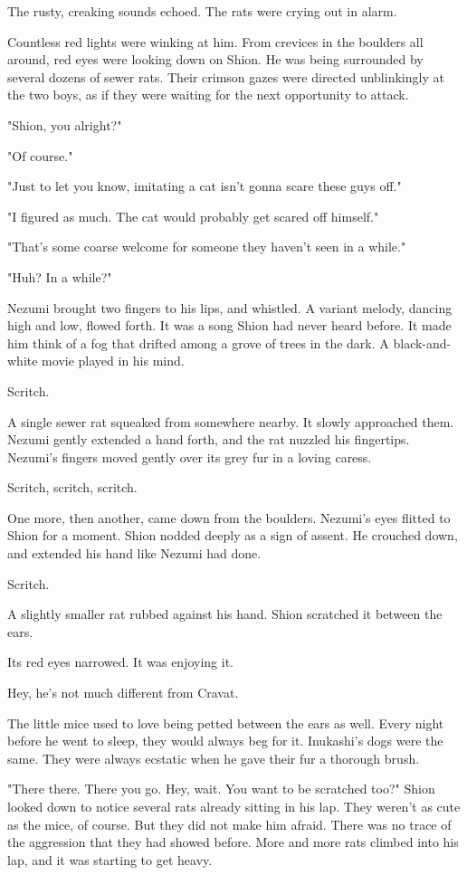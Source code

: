 The rusty, creaking sounds echoed. The rats were crying out in alarm.

Countless red lights were winking at him. From crevices in the boulders
all around, red eyes were looking down on Shion. He was being surrounded
by several dozens of sewer rats. Their crimson gazes were directed
unblinkingly at the two boys, as if they were waiting for the next
opportunity to attack.

"Shion, you alright?"

"Of course."

"Just to let you know, imitating a cat isn't gonna scare these guys
off."

"I figured as much. The cat would probably get scared off himself."

"That's some coarse welcome for someone they haven't seen in a while."

"Huh? In a while?"

Nezumi brought two fingers to his lips, and whistled. A variant melody,
dancing high and low, flowed forth. It was a song Shion had never heard
before. It made him think of a fog that drifted among a grove of trees
in the dark. A black-and-white movie played in his mind.

Scritch.

A single sewer rat squeaked from somewhere nearby. It slowly approached
them. Nezumi gently extended a hand forth, and the rat nuzzled his
fingertips. Nezumi's fingers moved gently over its grey fur in a loving
caress.

Scritch, scritch, scritch.

One more, then another, came down from the boulders. Nezumi's eyes
flitted to Shion for a moment. Shion nodded deeply as a sign of assent.
He crouched down, and extended his hand like Nezumi had done.

Scritch.

A slightly smaller rat rubbed against his hand. Shion scratched it
between the ears.

Its red eyes narrowed. It was enjoying it.

Hey, he's not much different from Cravat.

The little mice used to love being petted between the ears as well.
Every night before he went to sleep, they would always beg for it.
Inukashi's dogs were the same. They were always ecstatic when he gave
their fur a thorough brush.

"There there. There you go. Hey, wait. You want to be scratched too?"
Shion looked down to notice several rats already sitting in his lap.
They weren't as cute as the mice, of course. But they did not make him
afraid. There was no trace of the aggression that they had showed
before. More and more rats climbed into his lap, and it was starting to
get heavy.

